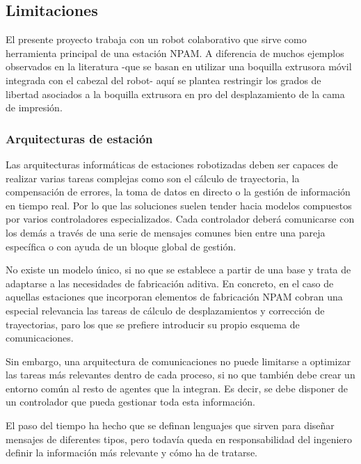 \subsection{Limitaciones} \label{seccion: Limitaciones}
El presente proyecto trabaja con un robot colaborativo que sirve como herramienta principal de una estación \acrshort{NPAM}. A diferencia de muchos ejemplos observados en la literatura -que se basan en utilizar una boquilla extrusora móvil integrada con el cabezal del robot- aquí se plantea restringir los grados de libertad asociados a la boquilla extrusora en pro del desplazamiento de la cama de impresión. 

\subsubsection*{Arquitecturas de estación}
\hypertarget{Arquitecturas de estación}{}

Las arquitecturas informáticas de estaciones robotizadas deben ser capaces de realizar varias tareas complejas como son el cálculo de trayectoria, la compensación de errores, la toma de datos en directo o la gestión de información en tiempo real. Por lo que las soluciones suelen tender hacia modelos compuestos por varios controladores especializados. Cada controlador deberá comunicarse con los demás a través de una serie de mensajes comunes bien entre una pareja específica o con ayuda de un bloque global de gestión.

No existe un modelo único, si no que se establece a partir de una base y trata de adaptarse a las necesidades de fabricación aditiva. En concreto, en el caso de aquellas estaciones que incorporan elementos de fabricación \acrshort{NPAM} cobran una especial relevancia las tareas de cálculo de desplazamientos y corrección de trayectorias, paro los que se prefiere introducir su propio esquema de comunicaciones.

Sin embargo, una arquitectura de comunicaciones no puede limitarse a optimizar las tareas más relevantes dentro de cada proceso, si no que también debe crear un entorno común al resto de agentes que la integran. Es decir, se debe disponer de un controlador que pueda gestionar toda esta información.

El paso del tiempo ha hecho que se definan lenguajes que sirven para diseñar mensajes de diferentes tipos, pero todavía queda en responsabilidad del ingeniero definir la información más relevante y cómo ha de tratarse.


